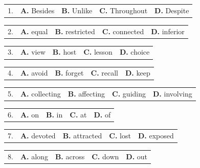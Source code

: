 \documentclass[UTF8,11pt]{ctexart}
\begin{document}
\noindent\begin{tabularx}{\linewidth}{@{}lXXXX@{}}1. & \textbf{A.} Besides & \textbf{B.} Unlike & \textbf{C.} Throughout & \textbf{D.} Despite\\\end{tabularx}\par

\noindent\begin{tabularx}{\linewidth}{@{}lXXXX@{}}2. & \textbf{A.} equal & \textbf{B.} restricted & \textbf{C.} connected & \textbf{D.} inferior\\\end{tabularx}\par

\noindent\begin{tabularx}{\linewidth}{@{}lXXXX@{}}3. & \textbf{A.} view & \textbf{B.} host & \textbf{C.} lesson & \textbf{D.} choice\\\end{tabularx}\par

\noindent\begin{tabularx}{\linewidth}{@{}lXXXX@{}}4. & \textbf{A.} avoid & \textbf{B.} forget & \textbf{C.} recall & \textbf{D.} keep\\\end{tabularx}\par

\noindent\begin{tabularx}{\linewidth}{@{}lXXXX@{}}5. & \textbf{A.} collecting & \textbf{B.} affecting & \textbf{C.} guiding & \textbf{D.} involving\\\end{tabularx}\par

\noindent\begin{tabularx}{\linewidth}{@{}lXXXX@{}}6. & \textbf{A.} on & \textbf{B.} in & \textbf{C.} at & \textbf{D.} of\\\end{tabularx}\par

\noindent\begin{tabularx}{\linewidth}{@{}lXXXX@{}}7. & \textbf{A.} devoted & \textbf{B.} attracted & \textbf{C.} lost & \textbf{D.} exposed\\\end{tabularx}\par

\noindent\begin{tabularx}{\linewidth}{@{}lXXXX@{}}8. & \textbf{A.} along & \textbf{B.} across & \textbf{C.} down & \textbf{D.} out\\\end{tabularx}\par
\end{document}

